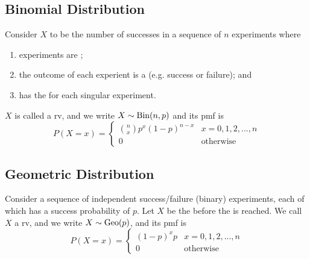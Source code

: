 \documentclass[notoc,notitlepage]{tufte-book}
\begin{document}
\subsection{Binomial Distribution}
\label{sub:binomial_distribution}

\begin{defn}[Binomial RV]\label{defn:binomial_rv}
  Consider $X$ to be the number of successes in a sequence of $n$ experiments where
  \begin{enumerate}
    \item experiments are ;
    \item the outcome of each experient is a  (e.g. success or failure); and
    \item has the  for each singular experiment.
  \end{enumerate}
  $X$ is called a  rv, and we write $X \sim \operatorname{Bin}(n, p)$ and its pmf is
  \begin{equation*}
    P(X = x) = \begin{cases} 
      \binom{n}{x} p^x (1 - p)^{n - x} & x = 0, 1, 2, ..., n \\
      0                                & \text{otherwise}
    \end{cases}
  \end{equation*}
\end{defn}


\subsection{Geometric Distribution}
\label{sub:geometric_distribution}

\begin{defn}[Geometric RV]\label{defn:geometric_rv}
  Consider a sequence of independent success/failure (binary) experiments, each of which has a success probability of $p$. Let $X$ be the  before the  is reached. We call $X$ a  rv, and we write $X \sim \operatorname{Geo}(p)$, and its pmf is
  \begin{equation*}
    P(X = x) = \begin{cases} 
      (1 - p)^x p & x = 0, 1, 2, ..., n \\
      0           & \text{otherwise}
    \end{cases}
  \end{equation*}
\end{defn}
\end{document}
